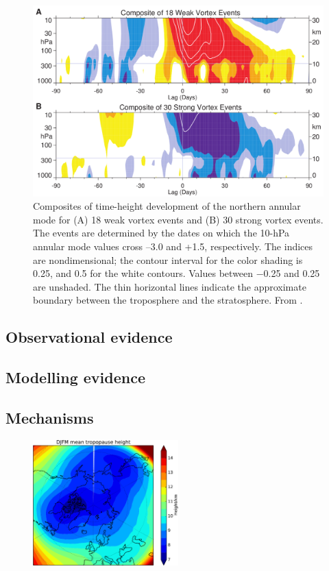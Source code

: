 \begin{figure}
 \centering
 \noindent\includegraphics[width=\textwidth]{figures/chapter-intro/Baldwin_Dunkerton.png}
 \caption[NAM composite from \citet{Baldwin2001a}]{Composites of time-height
   development of the northern annular mode for (A) 18 weak vortex events and
   (B) 30 strong vortex events. The events are determined by the dates on which
   the 10-hPa annular mode values cross –3.0 and +1.5, respectively. The indices
   are nondimensional; the contour interval for the color shading is 0.25, and
   0.5 for the white contours. Values between −0.25 and 0.25 are unshaded. The
   thin horizontal lines indicate the approximate boundary between the
   troposphere and the stratosphere. From \citet{Baldwin2001a}.}
 \label{fig:baldwin_dunkerton}
\end{figure}


\subsection{Observational evidence}
\label{sec:observ-evid}
\subsection{Modelling evidence}
\subsection{Mechanisms}
\label{sec:mechanisms}


\begin{figure}
 \centering
 \noindent\includegraphics[width=0.5\textwidth]{figures/chapter-intro/mean_tropopause_height.pdf}
 \caption[]{ }
 \label{fig:cmip5_mslp_diff}
\end{figure}










